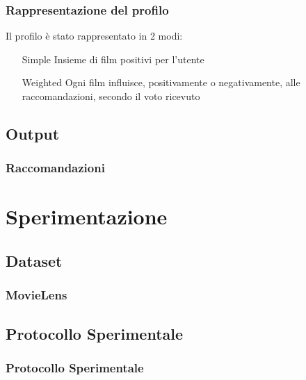 \documentclass{beamer}
\begin{document}

\begin{frame}
\frametitle{Rappresentazione del profilo}
Il profilo è stato rappresentato in 2 modi:

\begin{itemize}
\item[Simple] Insieme di film positivi per l'utente
\item[Weighted] Ogni film influisce, positivamente o negativamente, alle raccomandazioni, secondo il voto ricevuto
\end{itemize}


\end{frame}


\subsection{Output}


\begin{frame}
\frametitle{Raccomandazioni}
\end{frame}


\section{Sperimentazione}
\subsection{Dataset}


\begin{frame}
\frametitle{MovieLens}
\end{frame}


\subsection{Protocollo Sperimentale}


\begin{frame}
\frametitle{Protocollo Sperimentale}
\end{frame}
\end{document}
